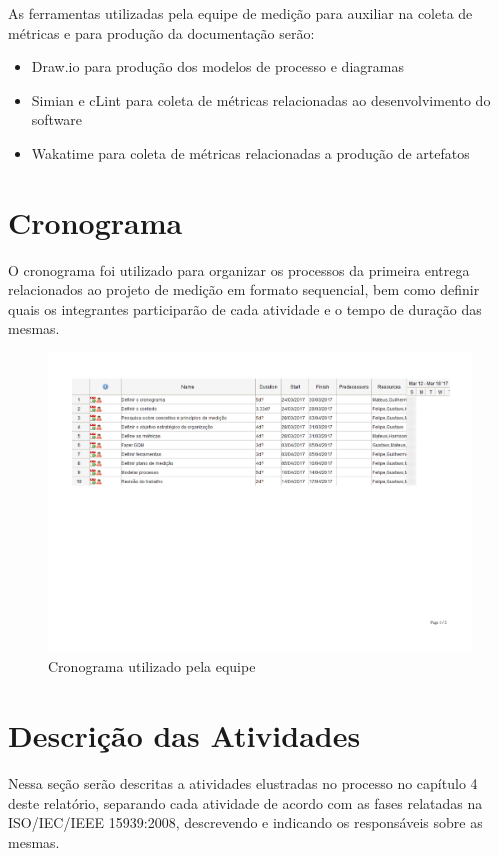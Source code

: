 	As ferramentas utilizadas pela equipe de medição para auxiliar na coleta de métricas e para produção da documentação serão:
	
	\begin{itemize}
		\item Draw.io para produção dos modelos de processo e diagramas
		\item Simian e cLint para coleta de métricas relacionadas ao desenvolvimento do software
		\item Wakatime para coleta de métricas relacionadas a produção de artefatos
	\end{itemize}
	
\section{Cronograma}
	O cronograma foi utilizado para organizar os processos da primeira entrega relacionados ao projeto de medição em formato sequencial, bem como definir quais os integrantes participarão de cada atividade e o tempo de duração das mesmas.
	
	\begin{figure}[!htpb]
		\centering
		\includegraphics [scale=0.35]{figuras/processo/cronograma}
		\caption{Cronograma utilizado pela equipe}
	\end{figure}

\section{Descrição das Atividades}

Nessa seção serão descritas a atividades elustradas no processo no capítulo 4 deste relatório, separando cada atividade de acordo com as fases relatadas na ISO/IEC/IEEE 15939:2008, descrevendo e indicando os responsáveis sobre as mesmas.

